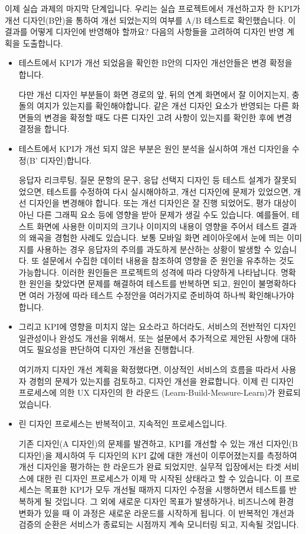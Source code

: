 \documentclass[
  letterpaper,
]{book}
\begin{document}
이제 실습 과제의 마지막 단계입니다. 우리는 실습 프로젝트에서 개선하고자
한 KPI가 개선 디자인(B안)을 통하여 개선 되었는지의 여부를 A/B 테스트로
확인했습니다. 이 결과를 어떻게 디자인에 반영해야 할까요? 다음의 사항들을
고려하여 디자인 반영 계획을 도출합니다.

\begin{itemize}
\item
  테스트에서 KPI가 개선 되었음을 확인한 B안의 디자인 개선안들은 변경
  확정을 합니다.

  다만 개선 디자인 부분들이 화면 경로의 앞, 뒤의 연계 화면에서 잘
  이어지는지, 충돌의 여지가 있는지를 확인해야합니다. 같은 개선 디자인
  요소가 반영되는 다른 화면들의 변경을 확정할 때도 다른 디자인 고려
  사항이 있는지를 확인한 후에 변경 결정을 합니다.
\item
  테스트에서 KPI가 개선 되지 않은 부분은 원인 분석을 실시하여 개선
  디자인을 수정(B' 디자인)합니다.

  응답자 리크루팅, 질문 문항의 문구, 응답 선택지 디자인 등 테스트 설계가
  잘못되었으면, 테스트를 수정하여 다시 실시해야하고, 개선 디자인에
  문제가 있었으면, 개선 디자인을 변경해야 합니다. 또는 개선 디자인은 잘
  진행 되었어도, 평가 대상이 아닌 다른 그래픽 요소 등에 영향을 받아
  문제가 생길 수도 있습니다. 예를들어, 테스트 화면에 사용한 이미지의
  크기나 이미지의 내용이 영향을 주어서 테스트 결과의 왜곡을 경험한
  사례도 있습니다. 보통 모바일 화면 레이아웃에서 눈에 띄는 이미지를
  사용하는 경우 응답자의 주의를 과도하게 분산하는 상황이 발생할 수
  있습니다. 또 설문에서 수집한 데이터 내용을 참조하여 영향을 준 원인을
  유추하는 것도 가능합니다. 이러한 원인들은 프로젝트의 성격에 따라
  다양하게 나타납니다. 명확한 원인을 찾았다면 문제를 해결하여 테스트를
  반복하면 되고, 원인이 불명확하다면 여러 가정에 따라 테스트 수정안을
  여러가지로 준비하여 하나씩 확인해나가야 합니다.
\item
  그리고 KPI에 영향을 미치지 않는 요소라고 하더라도, 서비스의 전반적인
  디자인 일관성이나 완성도 개선을 위해서, 또는 설문에서 추가적으로
  제안된 사항에 대하여도 필요성을 판단하여 디자인 개선을 진행합니다.

  여기까지 디자인 개선 계획을 확정했다면, 이상적인 서비스의 흐름을
  따라서 사용자 경험의 문제가 있는지를 검토하고, 디자인 개선을
  완료합니다. 이제 린 디자인 프로세스에 의한 UX 디자인의 한 라운드
  (Learn-Build-Measure-Learn)가 완료되었습니다.
\item
  린 디자인 프로세스는 반복적이고, 지속적인 프로세스입니다.

  기존 디자인(A 디자인)의 문제를 발견하고, KPI를 개선할 수 있는 개선
  디자인(B 디자인)을 제시하여 두 디자인의 KPI 값에 대한 개선이
  이루어졌는지를 측정하여 개선 디자인을 평가하는 한 라운드가 완료
  되었지만, 실무적 입장에서는 타겟 서비스에 대한 린 디자인 프로세스가
  이제 막 시작된 상태라고 할 수 있습니다. 이 프로세스는 목표한 KPI가
  모두 개선될 때까지 디자인 수정을 시행하면서 테스트를 반복하게 될
  것입니다. 그 외에 새로운 디자인 목표가 발생하거나, 비즈니스에 환경
  변화가 있을 때 이 과정은 새로운 라운드를 시작하게 됩니다. 이 반복적인
  개선과 검증의 순환은 서비스가 종료되는 시점까지 계속 모니터링 되고,
  지속될 것입니다.
\end{itemize}
\end{document}
